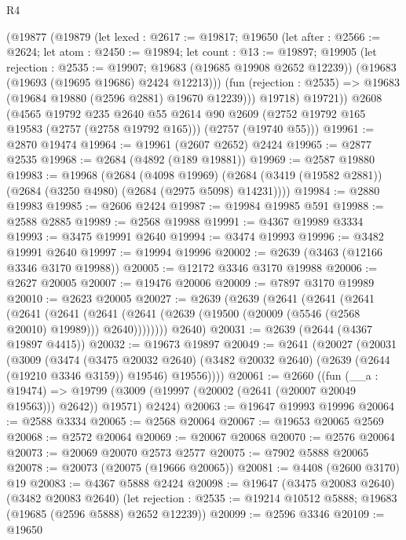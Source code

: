 \begin{lexlean}{R4}
\begin{coremodule}
      (@19877
        (@19879
          (let lexed : @2617 := @19817;
          @19650
            (let after : @2566 := @2624;
            let atom : @2450 := @19894;
            let count : @13 := @19897;
            @19905
              (let rejection : @2535 := @19907; @19683 (@19685 @19908 @2652 @12239))
              (@19683 (@19693 (@19695 @19686) @2424 @12213)))
            (fun (rejection : @2535) => @19683 (@19684 @19880 (@2596 @2881) @19670 @12239)))
          @19718)
        @19721))
    @2608
    (@4565
      @19792
      @235
      @2640
      @55
      @2614
      @90
      @2609
      (@2752 @19792 @165 @19583 (@2757 (@2758 @19792 @165)))
      (@2757 (@19740 @55)))
@19961 := @2870 @19474
@19964 := @19961 (@2607 @2652) @2424
@19965 := @2877 @2535
@19968 := @2684 (@4892 (@189 @19881))
@19969 := @2587 @19880
@19983 := @19968
    (@2684
      (@4098 @19969)
      (@2684 (@3419 (@19582 @2881)) (@2684 (@3250 @4980) (@2684 (@2975 @5098) @14231))))
@19984 := @2880 @19983
@19985 := @2606 @2424
@19987 := @19984 @19985 @591
@19988 := @2588 @2885
@19989 := @2568 @19988
@19991 := @4367 @19989 @3334
@19993 := @3475 @19991 @2640
@19994 := @3474 @19993
@19996 := @3482 @19991 @2640
@19997 := @19994 @19996
@20002 := @2639 (@3463 (@12166 @3346 @3170 @19988))
@20005 := @12172 @3346 @3170 @19988
@20006 := @2627 @20005
@20007 := @19476 @20006
@20009 := @7897 @3170 @19989
@20010 := @2623 @20005
@20027 := @2639
    (@2639
      (@2641
        (@2641
          (@2641
            (@2641
              (@2641
                (@2641 (@2641 (@2639 (@19500 (@20009 (@5546 (@2568 @20010) @19989))) @2640))))))))
      @2640)
@20031 := @2639 (@2644 (@4367 @19897 @4415))
@20032 := @19673 @19897
@20049 := @2641
    (@20027
      (@20031
        (@3009
          (@3474
            (@3475 @20032 @2640)
            (@3482 @20032 @2640)
            (@2639 (@2644 (@19210 @3346 @3159)) @19546)
            @19556))))
@20061 := @2660
    ((fun (__a : @19474) =>
    @19799 (@3009 (@19997 (@20002 (@2641 (@20007 @20049 @19563))) @2642)) @19571)
      @2424)
@20063 := @19647 @19993 @19996
@20064 := @2588 @3334
@20065 := @2568 @20064
@20067 := @19653 @20065 @2569
@20068 := @2572 @20064
@20069 := @20067 @20068
@20070 := @2576 @20064
@20073 := @20069 @20070 @2573 @2577
@20075 := @7902 @5888 @20065
@20078 := @20073 (@20075 (@19666 @20065))
@20081 := @4408 (@2600 @3170) @19
@20083 := @4367 @5888 @2424
@20098 := @19647
    (@3475 @20083 @2640)
    (@3482 @20083 @2640)
    (let rejection : @2535 := @19214 @10512 @5888; @19683 (@19685 (@2596 @5888) @2652 @12239))
@20099 := @2596 @3346
@20109 := @19650

\end{coremodule}
\end{lexlean}
